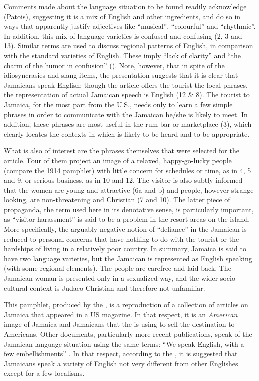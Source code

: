Comments made about the language situation to be found readily acknowledge  (Patois), suggesting it is a mix of English and other ingredients, and do so in ways that apparently justify adjectives like “musical”, “colourful” and “rhythmic”.  In addition, this mix of language varieties is confused and confusing (2, 3 and 13).  Similar terms are used to discuss regional patterns of English, in comparison with the standard varieties of English.  These imply “lack of clarity” and “the charm of the humor in confusion” (\citealt[292--293]{Silverstein1996}).  Note, however, that in spite of the idiosyncrasies and slang items, the presentation suggests that it is clear that Jamaicans speak English; though the article offers the tourist the local phrases, the representation of actual Jamaican speech is English (12 \& 8).  The tourist to Jamaica, for the most part from the U.S., needs only to learn a few simple phrases in order to communicate with the Jamaican he\slash she is likely to meet.  In addition, these phrases are most useful in the rum bar or marketplace (3), which clearly locates the contexts in which  is likely to be heard and to be appropriate.

  What is also of interest are the phrases themselves that were selected for the article.  Four of them project an image of a relaxed, happy-go-lucky people (compare the 1914 pamphlet) with little concern for schedules or time, as in 4, 5 and 9, or serious business, as in 10 and 12.  The visitor is also subtly informed that the women are young and attractive (6a and b) and people, however strange looking, are non-threatening and Christian (7 and 10).  The latter piece of propaganda, the term used here in its denotative sense, is particularly important, as “visitor harassment” is said to be a problem in the resort areas on the island.  More specifically, the arguably negative notion of “defiance” in the Jamaican is reduced to personal concerns that have nothing to do with the tourist or the hardships of living in a relatively poor country.  In summary, Jamaica is said to have two language varieties, but the Jamaican is represented as English speaking (with some regional elements).  The people are carefree and laid-back.  The Jamaican woman is presented only in a sexualized way, and the wider socio-cultural context is Judaeo-Christian and therefore not unfamiliar.

  This pamphlet, produced by the , is a reproduction of a collection of articles on Jamaica that appeared in a US magazine.  In that respect, it is an \textit{American} image of Jamaica and Jamaicans that the  is using to sell the destination to Americans.  Other  documents, particularly more recent publications, speak of the Jamaican language situation using the same terms: “We speak English, with a few embellishments” \citep{JTB2001}.  In that respect, according to the , it is suggested that Jamaicans speak a variety of English not very different from other Englishes except for a few localisms.

